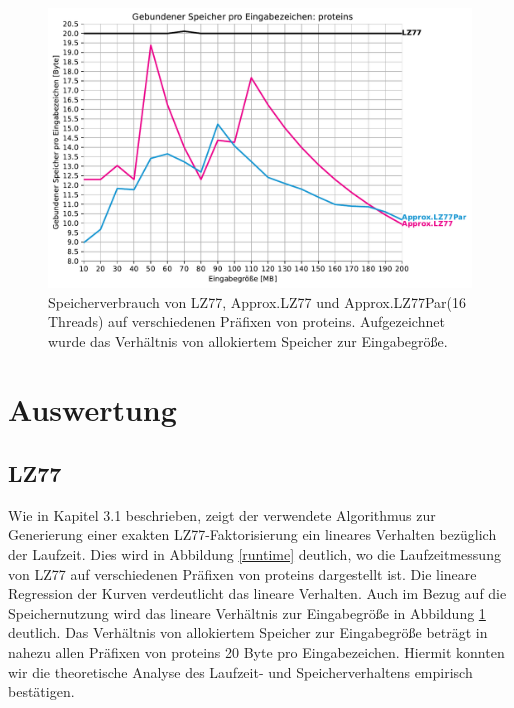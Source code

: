 \begin{figure}[ht]
    \centering
    \caption{Speicherverbrauch von LZ77, Approx.LZ77 und Approx.LZ77Par(16 Threads) auf verschiedenen Präfixen von proteins. Aufgezeichnet wurde das Verhältnis
    von allokiertem Speicher zur Eingabegröße.}
    \label{memory}
    \includegraphics[scale=0.6]{Images/progressive_mem.pdf}
\end{figure}

\section{Auswertung}
\subsection{LZ77}
Wie in Kapitel 3.1 beschrieben, zeigt der verwendete Algorithmus zur Generierung einer exakten LZ77-Faktorisierung ein lineares Verhalten bezüglich der Laufzeit.
Dies wird in Abbildung \ref{runtime} deutlich, wo die Laufzeitmessung von LZ77 auf verschiedenen Präfixen von proteins dargestellt ist. Die lineare Regression der
Kurven verdeutlicht das lineare Verhalten. Auch im Bezug auf die Speichernutzung wird das lineare Verhältnis zur Eingabegröße in Abbildung \ref{memory} deutlich.
Das Verhältnis von allokiertem Speicher zur Eingabegröße beträgt in nahezu allen Präfixen von proteins 20 Byte pro Eingabezeichen. Hiermit konnten wir die theoretische
Analyse des Laufzeit- und Speicherverhaltens empirisch bestätigen.

